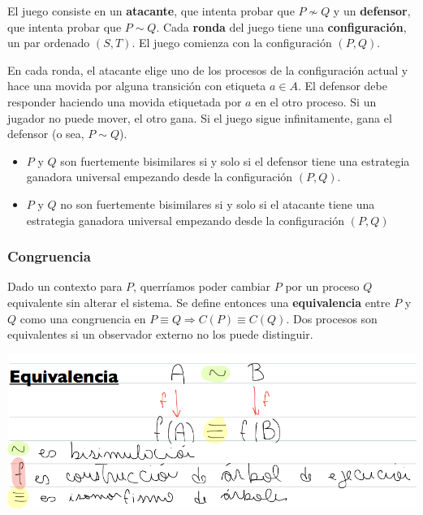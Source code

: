 \documentclass[]{article}
\begin{document}
El juego consiste en un \textbf{atacante}, que intenta probar que $P \not \sim Q$ y un \textbf{defensor}, que intenta probar que $P\sim Q$. Cada \textbf{ronda} del juego tiene una \textbf{configuración}, un par ordenado $(S,T)$. El juego comienza con la configuración $(P,Q)$.



En cada ronda, el atacante elige uno de los procesos de la configuración actual y hace una movida por alguna transición con etiqueta $a \in A$. El defensor debe responder haciendo una movida etiquetada por $a$ en el otro proceso. Si un jugador no puede mover, el otro gana. Si el juego sigue infinitamente, gana el defensor (o sea, $P\sim Q$).

\begin{itemize}
	\item $P$ y $Q$ son fuertemente bisimilares si y solo si el defensor tiene una estrategia ganadora universal empezando desde la configuración $(P, Q)$.
	\item $P$ y $Q$ no son fuertemente bisimilares si y solo si el atacante tiene una estrategia ganadora universal empezando desde la configuración $(P, Q)$
\end{itemize}

\subsubsection{Congruencia}
Dado un contexto para $P$, querríamos poder cambiar $P$ por un proceso $Q$ equivalente sin alterar el sistema. Se define entonces una \textbf{equivalencia} entre $P$ y $Q$ como una congruencia en $P \equiv Q \Rightarrow C(P)\equiv C(Q)$. Dos procesos son equivalentes si un observador externo no los puede distinguir.

\begin{center}
	\includegraphics[scale=0.5]{Equiv.png}
\end{center}
\end{document}
